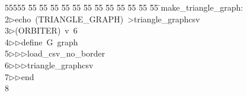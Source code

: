 %
%
\begin{tabbing}
55555 \= 55 \= 55 \= 55 \= 55 \= 55 \= 55 \= 55 \= 55 \= 55 \= 55 \= 55 \= 55 \= \>make\_triangle\_graph:\\[0pt]
2\>$\triangleright$\>echo\ (TRIANGLE\_GRAPH)\ {\textgreater}triangle\_graphcsv\\[0pt]
3\>$\triangleright$\>(ORBITER)\ v\ 6\ \\[0pt]
4\>$\triangleright$\>$\triangleright$\>define\ G\ graph\ \\[0pt]
5\>$\triangleright$\>$\triangleright$\>$\triangleright$\>load\_csv\_no\_border\ \\[0pt]
6\>$\triangleright$\>$\triangleright$\>$\triangleright$\>triangle\_graphcsv\ \\[0pt]
7\>$\triangleright$\>$\triangleright$\>end\\[0pt]
8\>\end{tabbing}
